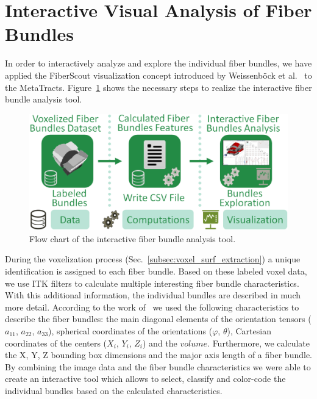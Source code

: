 \section{Interactive Visual Analysis of Fiber Bundles}
In order to interactively analyze and explore the individual fiber bundles, we have applied the FiberScout visualization concept introduced by Weissenb{\"o}ck et al.~\cite{Weissenbock2014} to the MetaTracts. Figure~\ref{fig:metatracts_fiberscout_workflow} shows the necessary steps to realize the interactive fiber bundle analysis tool.
\begin{figure}[htb]
	\centering
	\includegraphics[width=0.95\linewidth]{images/MetaTractsToFiberScout_workflow.eps}
	\caption{Flow chart of the interactive fiber bundle analysis tool.}
	\label{fig:metatracts_fiberscout_workflow}
\end{figure}
During the voxelization process (Sec.~\ref{subsec:voxel_surf_extraction}) a unique identification is assigned to each fiber bundle. Based on these labeled voxel data, we use ITK\cite{Ibanez2005} filters to calculate multiple interesting fiber bundle characteristics. With this additional information, the individual bundles are described in much more detail. According to the work of~\cite{Weissenbock2014} we used the following characteristics to describe the fiber bundles: the main diagonal elements of the orientation tensors ($a_{11}$, $a_{22}$, $a_{33}$), spherical coordinates of the orientations ($\varphi$, $\theta$), Cartesian coordinates of the centers ($X_{i}$, $Y_{i}$, $Z_{i}$) and the $volume$. Furthermore, we calculate the X, Y, Z bounding box dimensions and the major axis length of a fiber bundle. By combining the image data and the fiber bundle characteristics we were able to create an interactive tool which allows to select, classify and color-code the individual bundles based on the calculated characteristics.

